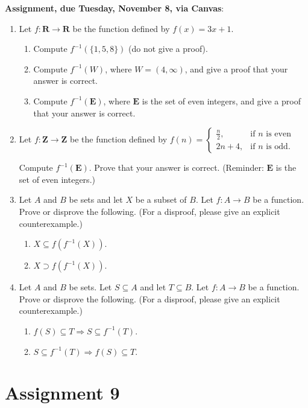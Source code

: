 \documentclass[12pt]{article}
\begin{document}
\noindent \textbf{Assignment, due Tuesday, November 8, via Canvas}:
\begin{enumerate}
\item Let $f \colon \mathbf{R} \to \mathbf{R}$ be the function defined by $f(x) = 3x+1$. 
 \begin{enumerate}
 \item Compute $f^{-1}(\{1,5,8\})$ (do not give a proof).
 \item Compute $f^{-1}(W)$, where $W = (4,\infty)$, and give a proof that your answer is correct.
 \item Compute $f^{-1}(\mathbf{E})$, where $\mathbf{E}$ is the set of even integers, and give a proof that your answer is correct.
 \end{enumerate}

\item Let $f \colon \mathbf{Z} \to \mathbf{Z}$ be the function defined by $f(n) =
 \begin{cases}
 \frac{n}{2}, & \text{if $n$ is even} \\
 2n+4, & \text{if $n$ is odd}.
 \end{cases}
 $
 
 Compute $f^{-1}(\mathbf{E})$. Prove that your answer is correct. (Reminder: $\mathbf{E}$ is the set of even integers.)
\item Let $A$ and $B$ be sets and let $X$ be a subset of $B$. Let $f\colon A \to B$ be a function. Prove or disprove the following. (For a disproof, please give an explicit counterexample.)
 \begin{enumerate}
 \item $X \subseteq f(f^{-1}(X))$.
 \item $X \supset f(f^{-1}(X))$.
 \end{enumerate}

\item Let $A$ and $B$ be sets. Let $S \subseteq A$ and let $T \subseteq B$. Let $f\colon A \to B$ be a function. Prove or disprove the following. (For a disproof, please give an explicit counterexample.)
 \begin{enumerate}
 \item $f(S) \subseteq T \Rightarrow S \subseteq f^{-1}(T)$.
 \item $S \subseteq f^{-1}(T) \Rightarrow f(S) \subseteq T$.
 \end{enumerate}
 
\end{enumerate}


\newpage
\section[9 (due November 15): Injectivity.]{Assignment 9}
\end{document}
